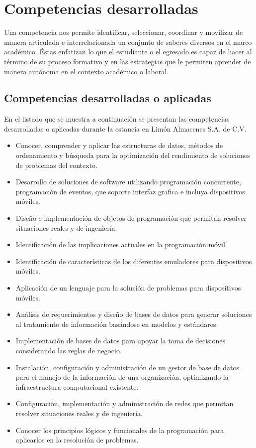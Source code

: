 \chapter{Competencias desarrolladas}

Una competencia nos permite identificar, seleccionar, coordinar y movilizar de manera articulada e interrelacionada un conjunto de saberes diversos en el marco académico. Éstas enfatizan lo que el estudiante o el egresado es capaz de hacer al término de su proceso formativo y en las estrategias que le permiten aprender de manera autónoma en el contexto académico o laboral.

\section{Competencias desarrolladas o aplicadas}

En el listado que se muestra a continuación se presentan las competencias desarrolladas o aplicadas durante la estancia en Limón Almacenes S.A. de C.V.

\begin{itemize}
	\item Conocer, comprender y aplicar las estructuras de datos, métodos de ordenamiento y búsqueda para la optimización del rendimiento de soluciones de problemas del contexto.
	\item Desarrollo de soluciones de software utilizando programación concurrente, programación de eventos, que soporte interfaz grafica e incluya dispositivos móviles.
	\item Diseño e implementación de objetos de programación que permitan resolver situaciones reales y de ingeniería.
	\item Identificación de las implicaciones actuales en la
	programación móvil.
	\item Identificación de características de los diferentes emuladores para dispositivos móviles.
	\item Aplicación de un lenguaje para la solución de problemas para dispositivos móviles.
	\item Análisis de requerimientos y diseño de bases de datos para generar soluciones al tratamiento de información basándose en modelos y estándares.
	\item Implementación de bases de datos para apoyar la toma de decisiones considerando las reglas de negocio.
	\item Instalación, configuración y administración de un gestor de base de datos para el manejo de la información de una organización, optimizando la infraestructura computacional existente.
	\item Configuración, implementación y administración de redes que permitan resolver situaciones reales y de ingeniería.
	\item Conocer los principios lógicos y funcionales de la programación para aplicarlos en la resolución de problemas.
\end{itemize}